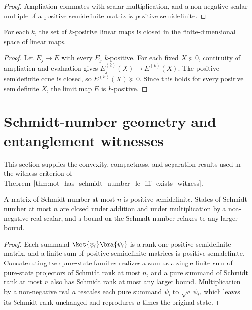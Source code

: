 \begin{proof}
    \leanok
    Ampliation commutes with scalar multiplication, and a non-negative scalar
    multiple of a positive semidefinite matrix is positive semidefinite.
\end{proof}

\begin{theorem}
    \label{thm:k_positive_closed}
    \leanok
    For each $k$, the set of $k$-positive linear maps is closed in the
    finite-dimensional space of linear maps.
\end{theorem}

\begin{proof}
    \leanok
    Let $E_j\to E$ with every $E_j$ $k$-positive. For each fixed
    $X\succeq0$, continuity of ampliation and evaluation gives
    $E_j^{(k)}(X)\to E^{(k)}(X)$. The positive semidefinite cone is closed, so
    $E^{(k)}(X)\succeq0$. Since this holds for every positive semidefinite
    $X$, the limit map $E$ is $k$-positive.
\end{proof}

\section{Schmidt-number geometry and entanglement witnesses}
\label{sec:app_positive_not_cp_schmidt_number_geometry}

This section supplies the convexity, compactness, and separation results used
in the witness criterion of Theorem~\ref{thm:not_has_schmidt_number_le_iff_exists_witness}.

\begin{theorem}
    \label{thm:has_schmidt_number_le_basic}
    \leanok
    A matrix of Schmidt number at most $n$ is positive semidefinite. States of
    Schmidt number at most $n$ are closed under addition and under multiplication by a
    non-negative real scalar, and a bound on the Schmidt number relaxes to any larger
    bound.
\end{theorem}

\begin{proof}
    \leanok
    Each summand $\ket{\psi_i}\bra{\psi_i}$ is a rank-one positive semidefinite
    matrix, and a finite sum of positive semidefinite matrices is positive
    semidefinite. Concatenating two pure-state families realizes a sum as a single
    finite sum of pure-state projectors of Schmidt rank at most $n$, and a pure
    summand of Schmidt rank at most $n$ also has Schmidt rank at most any larger
    bound. Multiplication by a non-negative real $a$ rescales each pure summand
    $\psi_i$ to $\sqrt a\,\psi_i$, which leaves its Schmidt rank unchanged and
    reproduces $a$ times the original state.
\end{proof}

